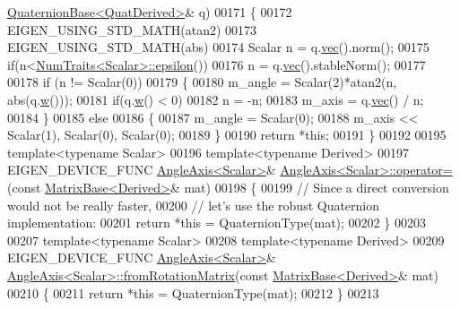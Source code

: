 \begin{DoxyCode}
      \hyperlink{group___geometry___module_class_eigen_1_1_quaternion_base}{QuaternionBase<QuatDerived>}& q)
00171 \{
00172   EIGEN\_USING\_STD\_MATH(atan2)
00173   EIGEN\_USING\_STD\_MATH(abs)
00174   Scalar n = q.\hyperlink{group___geometry___module_aa8a52640dfd34f910d18f110ccccd1b9}{vec}().norm();
00175   \textcolor{keywordflow}{if}(n<\hyperlink{group___core___module_struct_eigen_1_1_num_traits}{NumTraits<Scalar>::epsilon}())
00176     n = q.\hyperlink{group___geometry___module_aa8a52640dfd34f910d18f110ccccd1b9}{vec}().stableNorm();
00177 
00178   \textcolor{keywordflow}{if} (n != Scalar(0))
00179   \{
00180     m\_angle = Scalar(2)*atan2(n, abs(q.\hyperlink{group___geometry___module_a1f3f580927483150d4558c327988a9b4}{w}()));
00181     \textcolor{keywordflow}{if}(q.\hyperlink{group___geometry___module_a1f3f580927483150d4558c327988a9b4}{w}() < 0)
00182       n = -n;
00183     m\_axis  = q.\hyperlink{group___geometry___module_aa8a52640dfd34f910d18f110ccccd1b9}{vec}() / n;
00184   \}
00185   \textcolor{keywordflow}{else}
00186   \{
00187     m\_angle = Scalar(0);
00188     m\_axis << Scalar(1), Scalar(0), Scalar(0);
00189   \}
00190   \textcolor{keywordflow}{return} *\textcolor{keyword}{this};
00191 \}
00192 
00195 \textcolor{keyword}{template}<\textcolor{keyword}{typename} Scalar>
00196 \textcolor{keyword}{template}<\textcolor{keyword}{typename} Derived>
00197 EIGEN\_DEVICE\_FUNC \hyperlink{group___geometry___module_class_eigen_1_1_angle_axis}{AngleAxis<Scalar>}& 
      \hyperlink{group___geometry___module_class_eigen_1_1_angle_axis}{AngleAxis<Scalar>::operator=}(\textcolor{keyword}{const} 
      \hyperlink{group___core___module_class_eigen_1_1_matrix_base}{MatrixBase<Derived>}& mat)
00198 \{
00199   \textcolor{comment}{// Since a direct conversion would not be really faster,}
00200   \textcolor{comment}{// let's use the robust Quaternion implementation:}
00201   \textcolor{keywordflow}{return} *\textcolor{keyword}{this} = QuaternionType(mat);
00202 \}
00203 
00207 \textcolor{keyword}{template}<\textcolor{keyword}{typename} Scalar>
00208 \textcolor{keyword}{template}<\textcolor{keyword}{typename} Derived>
00209 EIGEN\_DEVICE\_FUNC \hyperlink{group___geometry___module_class_eigen_1_1_angle_axis}{AngleAxis<Scalar>}& 
      \hyperlink{group___geometry___module_class_eigen_1_1_angle_axis}{AngleAxis<Scalar>::fromRotationMatrix}(\textcolor{keyword}{const} 
      \hyperlink{group___core___module_class_eigen_1_1_matrix_base}{MatrixBase<Derived>}& mat)
00210 \{
00211   \textcolor{keywordflow}{return} *\textcolor{keyword}{this} = QuaternionType(mat);
00212 \}
00213 

\end{DoxyCode}
